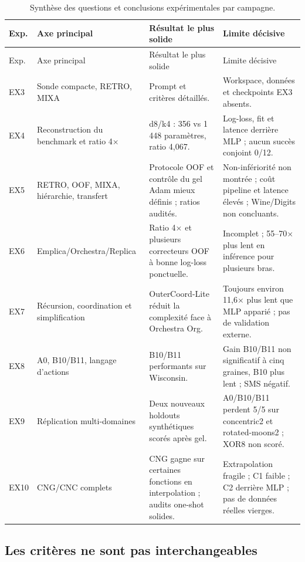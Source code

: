 \documentclass[11pt,a4paper]{article}
\begin{document}
\begin{longtable}{p{1.05cm}p{3.2cm}p{4.6cm}p{4.2cm}}
\caption{Synthèse des questions et conclusions expérimentales par campagne.}\\
\toprule
Exp. & Axe principal & Résultat le plus solide & Limite décisive\\
\midrule
\endfirsthead
\toprule
Exp. & Axe principal & Résultat le plus solide & Limite décisive\\
\midrule
\endhead
EX3 & Sonde compacte, RETRO, MIXA & Prompt et critères détaillés. & Workspace, données et checkpoints EX3 absents.\\
EX4 & Reconstruction du benchmark et ratio 4\(\times\) & d8/k4 : 356 vs 1\,448 paramètres, ratio 4,067. & Log-loss, fit et latence derrière MLP ; aucun succès conjoint 0/12.\\
EX5 & RETRO, OOF, MIXA, hiérarchie, transfert & Protocole OOF et contrôle du gel Adam mieux définis ; ratios audités. & Non-infériorité non montrée ; coût pipeline et latence élevés ; Wine/Digits non concluants.\\
EX6 & Emplica/Orchestra/Replica & Ratio 4\(\times\) et plusieurs correcteurs OOF à bonne log-loss ponctuelle. & Incomplet ; 55--70\(\times\) plus lent en inférence pour plusieurs bras.\\
EX7 & Récursion, coordination et simplification & OuterCoord-Lite réduit la complexité face à Orchestra Org. & Toujours environ 11,6\(\times\) plus lent que MLP apparié ; pas de validation externe.\\
EX8 & A0, B10/B11, langage d'actions & B10/B11 performants sur Wisconsin. & Gain B10/B11 non significatif à cinq graines, B10 plus lent ; SMS négatif.\\
EX9 & Réplication multi-domaines & Deux nouveaux holdouts synthétiques scorés après gel. & A0/B10/B11 perdent 5/5 sur concentric2 et rotated-moons2 ; XOR8 non scoré.\\
EX10 & CNG/CNC complets & CNG gagne sur certaines fonctions en interpolation ; audits one-shot solides. & Extrapolation fragile ; C1 faible ; C2 derrière MLP ; pas de données réelles vierges.\\
\bottomrule
\end{longtable}

\subsection{Les critères ne sont pas interchangeables}
\end{document}
